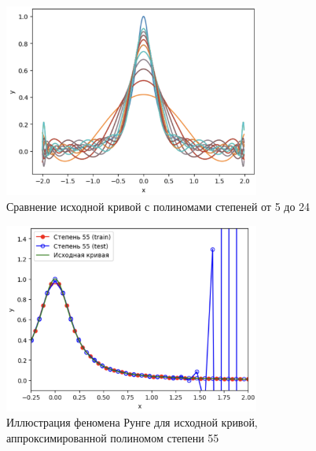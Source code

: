 \begin{figure}
	\begin{center}
		\includegraphics[width=0.75\textwidth]{images/8.png}
	\end{center}
	\caption{Сравнение исходной кривой с полиномами степеней от 5 до 24}
	\label{img:8}
\end{figure}

\begin{figure}
	\begin{center}
		\includegraphics[width=0.75\textwidth]{images/9.png}
	\end{center}
	\caption{Иллюстрация феномена Рунге для исходной кривой, аппроксимированной полиномом степени 55}
	\label{img:9}
\end{figure}

\clearpage
